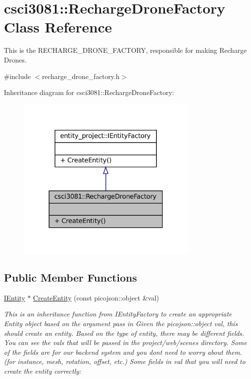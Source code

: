 \hypertarget{classcsci3081_1_1RechargeDroneFactory}{}\section{csci3081\+:\+:Recharge\+Drone\+Factory Class Reference}
\label{classcsci3081_1_1RechargeDroneFactory}


This is the R\+E\+C\+H\+A\+R\+G\+E\+\_\+\+D\+R\+O\+N\+E\+\_\+\+F\+A\+C\+T\+O\+RY, responsible for making Recharge Drones.  




{\ttfamily \#include $<$recharge\+\_\+drone\+\_\+factory.\+h$>$}



Inheritance diagram for csci3081\+:\+:Recharge\+Drone\+Factory\+:
\nopagebreak
\begin{figure}[H]
\begin{center}
\leavevmode
\includegraphics[width=255pt]{classcsci3081_1_1RechargeDroneFactory__inherit__graph}
\end{center}
\end{figure}
\subsection*{Public Member Functions}
\begin{DoxyCompactItemize}
\item 
\hyperlink{classentity__project_1_1IEntity}{I\+Entity} $\ast$ \hyperlink{classcsci3081_1_1RechargeDroneFactory_ab6da0dbaa91fb44d3ae1ebaefeb07091}{Create\+Entity} (const picojson\+::object \&val)
\begin{DoxyCompactList}\small\item\em This is an inheritance function from I\+Entity\+Factory to create an appropriate Entity object based on the argument pass in Given the picojson\+::object val, this should create an entity. Based on the type of entity, there may be different fields. You can see the vals that will be passed in the project/web/scenes directory. Some of the fields are for our backend system and you don\textquotesingle{}t need to worry about them. (for instance, mesh, rotation, offset, etc.) Some fields in val that you will need to create the entity correctly\+: \end{DoxyCompactList}\end{DoxyCompactItemize}


